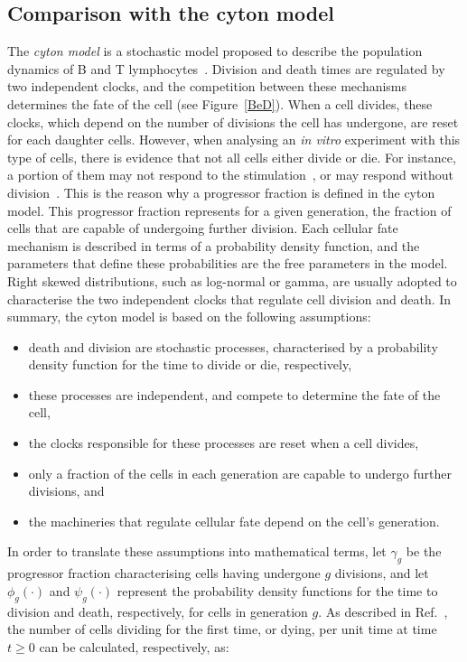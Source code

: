 \documentclass[10pt]{article}
\numberwithin{equation}{section}
\begin{document}
\subsection{Comparison with the cyton model}
\label{Cyton_model}

The {\em cyton model} is a stochastic model proposed to describe the population dynamics of B and T lymphocytes~\cite{hawkins2007model}. Division and death times are regulated by two independent clocks, and the competition between these mechanisms determines the fate of the cell (see Figure~\ref{BeD}). When a cell divides, these clocks, which depend on the number of divisions the cell has undergone, are reset for each daughter cells. However, when analysing an {\it in vitro} experiment with this type of cells, there is evidence that not all cells either divide or die. For instance, a portion of them may not respond to the stimulation~\cite{pereira}, or may respond without division~\cite{deenick}. This is the reason why a progressor fraction is defined in the cyton model.  This progressor fraction represents
for a given generation, the fraction of cells that are capable of undergoing further division. Each cellular fate mechanism is described in terms of a probability density function, and the parameters that define these probabilities are the free parameters in the model. Right skewed distributions, such as log-normal or gamma, are usually adopted to characterise the 
two independent clocks that regulate cell division and death. 
In summary, the cyton model is based on the following assumptions:
\begin{itemize}
    \item death and division are stochastic processes, characterised by a probability density function for the time to divide or die, respectively,
    \item these processes are independent, and compete to determine the fate of the cell,
    \item the clocks responsible for these processes are reset when a cell divides,
    \item only a fraction of the cells in each generation are capable to undergo further divisions, and 
    \item the machineries that regulate cellular fate depend on the cell's generation.
\end{itemize}
In order to translate these assumptions into mathematical terms, let $\gamma_g$ be the progressor fraction characterising cells having undergone $g$ divisions, and let $\phi_g(\cdot)$ and $\psi_g(\cdot)$ represent the probability density functions for the time to division and death, respectively, for cells in generation $g$. As described in Ref.~\cite{hawkins2007model}, the number of cells dividing for the first time, or dying, per unit time at time $t\geq 0$ can be calculated, respectively, as:
\end{document}
